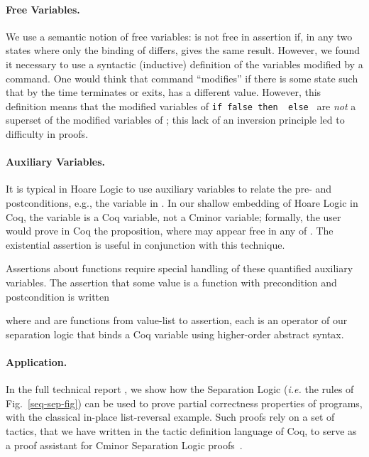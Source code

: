 \documentclass{llncs}
\newcommand{\cminor}{Cminor}
\begin{document}
\paragraph{Free Variables.}
We use a semantic notion of free variables:  is not free in
assertion  if, in any two states where only the binding of 
differs,  gives the same result.  However, we found it necessary to
use a syntactic (inductive) definition of the variables modified by a
command.  One would think that command  ``modifies''  if there
is some state such that by the time  terminates or exits,  has a
different value.  However, this definition means that the modified
variables of \texttt{if~false~then~~else~} are \emph{not} a
superset of the modified variables of ; this lack of an inversion
principle led to difficulty in proofs.

\paragraph{Auxiliary Variables.}  It is typical in Hoare Logic to use auxiliary variables to relate the pre- and postconditions, e.g., the variable  in
.  In our shallow embedding of Hoare Logic
in Coq, the variable  is a Coq variable, not a \cminor{} variable;
formally, the user would prove in Coq the proposition,  where  may appear free in any of
.  The existential assertion  is useful
in conjunction with this technique.

Assertions about functions require special handling of these 
quantified auxiliary variables.  The assertion that some value  is a 
function with precondition  and postcondition  is written

where  and  are functions from value-list to assertion, each
 is an operator of our separation logic that
binds a Coq variable  using higher-order abstract syntax.


\paragraph{Application.}
In the full technical report \cite{appel07:tr}, 
we show how the Separation Logic (\textit{i.e.} the rules of Fig.~\ref{seq-sep-fig}) 
can be used to prove partial correctness properties of programs,
with the classical in-place list-reversal example.
Such proofs rely on a set of tactics, that we have written in the tactic definition language of Coq, 
to serve as a proof assistant for \cminor{} Separation Logic proofs~\cite{appel06:septacs}.
\end{document}
